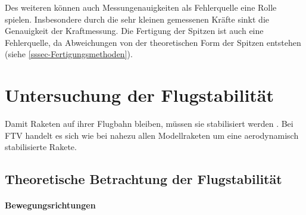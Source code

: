 \documentclass[10pt,a4paper]{article}
\begin{document}

Des weiteren können auch Messungenauigkeiten als Fehlerquelle eine Rolle spielen. Insbesondere durch die sehr kleinen gemessenen Kräfte sinkt die Genauigkeit der Kraftmessung. Die Fertigung der Spitzen ist auch eine Fehlerquelle, da Abweichungen von der theoretischen Form der Spitzen entstehen (siehe \ref{sssec-Fertigungsmethoden}).



\section{Untersuchung der Flugstabilität}

Damit Raketen auf ihrer Flugbahn bleiben, müssen sie stabilisiert werden \cite{dl}. Bei FTV handelt es sich wie bei nahezu allen Modellraketen um eine aerodynamisch stabilisierte Rakete.


\subsection{Theoretische Betrachtung der Flugstabilität}
\label{ssec-Theoretische-Btrachtung-Flugstabilität}

\paragraph{Bewegungsrichtungen}
\end{document}
